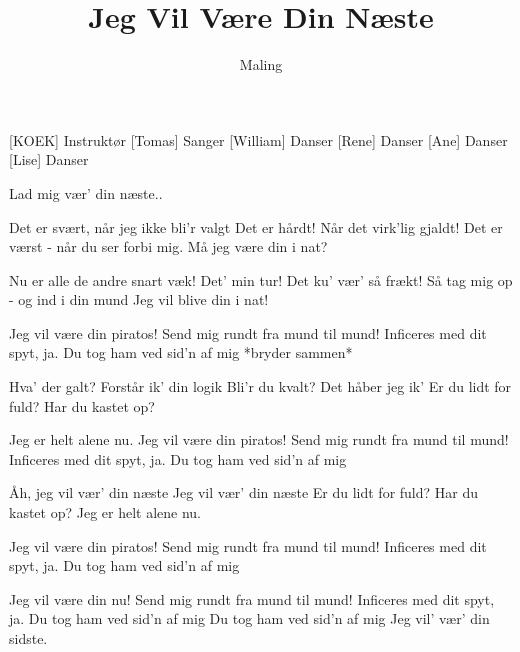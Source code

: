 \documentclass[a4paper,11pt]{article}
\title{Jeg Vil Være Din Næste}
\author{Maling}
\begin{document}
  \maketitle

  \begin{roles}
    [KOEK] Instruktør
    [Tomas] Sanger
    [William] Danser
    [Rene] Danser
    [Ane] Danser
    [Lise] Danser
  \end{roles}

  \begin{song}
 Lad mig vær' din næste..

Det er svært, når jeg ikke bli'r valgt
Det er hårdt! Når det virk'lig gjaldt!
Det er værst - når du ser forbi mig.
Må jeg være din i nat?

Nu er alle de andre snart væk!
Det' min tur! Det ku' vær' så frækt!
Så tag mig op - og ind i din mund
Jeg vil blive din i nat!

Jeg vil være din piratos!
Send mig rundt fra mund til mund!
Inficeres med dit spyt, ja.
Du tog ham ved sid'n af mig *bryder sammen*

Hva' der galt? Forstår ik' din logik
Bli'r du kvalt? Det håber jeg ik'
Er du lidt for fuld?
Har du kastet op?

Jeg er helt alene nu. 
Jeg vil være din piratos!
Send mig rundt fra mund til mund!
Inficeres med dit spyt, ja.
Du tog ham ved sid'n af mig

Åh, jeg vil vær' din næste
Jeg vil vær' din næste
Er du lidt for fuld?
Har du kastet op?
Jeg er helt alene nu.

Jeg vil være din piratos!
Send mig rundt fra mund til mund!
Inficeres med dit spyt, ja.
Du tog ham ved sid'n af mig

Jeg vil være din nu!
Send mig rundt fra mund til mund!
Inficeres med dit spyt, ja.
Du tog ham ved sid'n af mig
Du tog ham ved sid'n af mig
Jeg vil' vær' din sidste.
\end{song}
\end{document}
